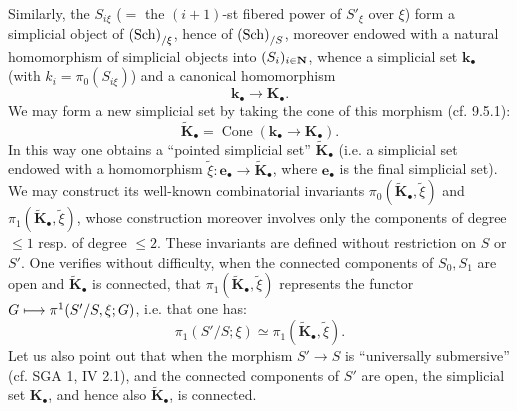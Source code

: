 Similarly, the $S_{i\xi}$ ($=$ the $(i+1)$-st fibered power of $S'_\xi$ over $\xi$) form a simplicial object of $\textup{(Sch)}_{/\xi}$, hence of $\textup{(Sch)}_{/S}$, moreover endowed with a natural homomorphism of simplicial objects into $(S_i)_{i\in\mathbf{N}}$, whence a simplicial set $\mathbf k_\bullet$ (with $k_i=\pi_0(S_{i\xi})$) and a canonical homomorphism
\[
\mathbf k_\bullet\to\mathbf K_\bullet.
\]
We may form a new simplicial set by taking the cone of this morphism (cf. 9.5.1):
\[
\widetilde{\mathbf K}_\bullet=\operatorname{Cone}(\mathbf k_\bullet\to\mathbf K_\bullet).
\]
 In this way one obtains a ``pointed simplicial set'' $\widetilde{\mathbf K}_\bullet$ (i.e. a simplicial set endowed with a homomorphism $\widetilde\xi:\mathbf e_\bullet\to\widetilde{\mathbf K}_\bullet$, where $\mathbf e_\bullet$ is the final simplicial set). We may construct its well-known combinatorial invariants $\pi_0(\widetilde{\mathbf K}_\bullet,\widetilde\xi)$ and $\pi_1(\widetilde{\mathbf K}_\bullet,\widetilde\xi)$, whose construction moreover involves only the components of degree $\leq1$ resp. of degree $\leq2$. These invariants are defined without restriction on $S$ or $S'$. One verifies without difficulty, when the connected components of $S_0,S_1$ are open and $\widetilde{\mathbf K}_\bullet$ is connected, that $\pi_1(\widetilde{\mathbf K}_\bullet,\widetilde\xi)$ represents the functor $G\longmapsto\pi^1(S'/S,\xi;G)$, i.e. that one has:
\[
\pi_1(S'/S;\xi)\simeq\pi_1(\widetilde{\mathbf K}_\bullet,\widetilde\xi).
\]
Let us also point out that when the morphism $S'\to S$ is ``universally submersive'' (cf. SGA 1, IV 2.1), and the connected components of $S'$ are open, the simplicial set $\mathbf K_\bullet$, and hence also $\widetilde{\mathbf K}_\bullet$, is connected.
